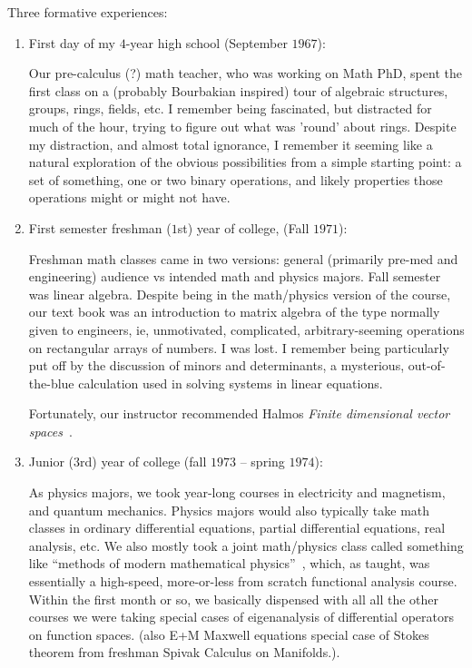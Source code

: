 \documentclass[11pt,openany]{book}
\begin{document}
Three formative experiences:
\begin{enumerate}
  \item First day of my $4$-year high school (September $1967$):
  \par
  Our pre-calculus (?) math teacher, who was working on Math PhD,
  spent the first class on a (probably Bourbakian inspired) tour 
  of algebraic structures, groups, rings, fields, etc.
  I remember being fascinated, but distracted for much of the hour, 
  trying to figure out what was 'round' about rings.
  Despite my distraction, and almost total ignorance, 
  I remember it seeming like a natural exploration of the obvious
  possibilities from a simple starting point: a set of something,
  one or two binary operations, and likely properties those
  operations might or might not have.
 
  \item First semester freshman ($1$st) year of college,
  (Fall $1971$):
  \par
  Freshman math classes came in two versions: 
  general (primarily pre-med and engineering) audience
  vs intended math and physics majors. Fall semester was linear 
  algebra. Despite being in the math/physics version of the course,
  our text book was an introduction to matrix algebra of the type
  normally given to engineers, ie, unmotivated, complicated,
  arbitrary-seeming operations on rectangular arrays of numbers.
  I was lost. I remember being particularly put off by the 
  discussion of minors and determinants, a mysterious, 
  out-of-the-blue calculation used in solving systems in linear
  equations.
  \par
  Fortunately, our instructor recommended 
  Halmos \textit{Finite dimensional vector 
  spaces}~\cite{halmos1958finite}. 
  
  \item Junior ($3$rd) year of college 
  (fall $1973$ -- spring $1974$):
  \par
  As physics majors, we took year-long courses in 
  electricity and magnetism, and quantum mechanics.
  Physics majors would also typically take math classes in
  ordinary differential equations, partial differential equations,
  real analysis, etc. We also mostly took a joint math/physics
  class called something like ``methods of modern mathematical 
  physics''~\cite{reed_simon_1972_functional_analysis}, 
  which, as taught, was essentially a high-speed,
  more-or-less from scratch functional analysis course.
  Within the first month or so, we basically dispensed with all
  all the other courses we were taking special cases of 
  eigenanalysis of differential operators on function spaces.
  (also E+M Maxwell equations special case of Stokes theorem 
  from freshman Spivak Calculus on Manifolds.).
  
\end{enumerate}
\end{document}
